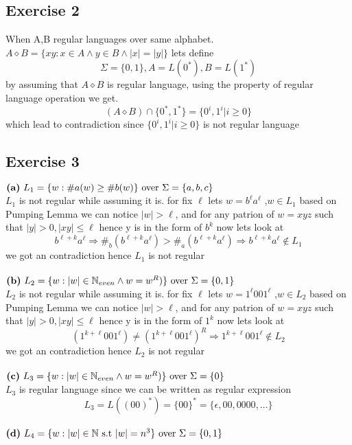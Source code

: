\documentclass[12pt]{article}
\newcommand{\N}{\mathbb{N}}
\begin{document}
\subsection{Exercise 2}
When A,B regular languages over same alphabet. $A \diamond B = \lbrace xy : x \in A \wedge y \in B \wedge |x| = |y|\rbrace$ lets define 
\[
\Sigma=\lbrace 0,1 \rbrace, A=L(0^*), B=L(1^*)
\]
by assuming that $ A \diamond B $ is regular language, using the property of regular language operation we get.
 \[(A \diamond B )\cap \lbrace 0^*,1^*\rbrace=\lbrace 0^i,1^i|i\geq 0 \rbrace
 \]
which lead to contradiction since $\lbrace 0^i,1^i|i\geq 0 \rbrace $ is not regular language
\subsection{Exercise 3}
$\text{\textbf{(a)} } L_1 = \lbrace w : \# a(w) \geq \# b(w)\rbrace  \text{ over } \Sigma =  \lbrace a, b, c\rbrace$\\
  $L_1$ is not regular while assuming it is. for fix $\ell$ lets $w=b^\ell a^\ell$ ,$w\in L_1$ based on Pumping Lemma we can notice $|w|>\ell$, and for any patrion of $w=xyz$ such that $|y|>0,|xy|\leq \ell$ hence y is in the form  of $b^k$ now lets look at 
  \[
  b^{\ell+k}a^{\ell}\Rightarrow \#_{b}(b^{\ell+k}a^{\ell})>\#_{a}(b^{\ell+k}a^{\ell})\Rightarrow b^{\ell+k}a^{\ell} \notin L_1
  \]
we got an contradiction hence $L_1$ is not regular\\\\
$\text{\textbf{(b)} } L_2 = \lbrace w : |w| \in \N_{even} \wedge w=w^R )\rbrace  \text{ over } \Sigma =  \lbrace 0,1 \rbrace$\\
$L_2$ is not regular while assuming it is. for fix $\ell$ lets $w=1^\ell001^\ell$ ,$w\in L_2$ based on Pumping Lemma we can notice $|w|>\ell$, and for any patrion of $w=xyz$ such that $|y|>0,|xy|\leq \ell$ hence y is in the form  of $1^k$ now lets look at
  \[
  (1^{k+\ell}001^\ell)\neq (1^{k+\ell}001^\ell)^R\Rightarrow 1^{k+\ell}001^\ell \notin L_2
  \]
we got an contradiction hence $L_2$ is not regular\\\\
$\text{\textbf{(c)} } L_3 = \lbrace w : |w| \in \N_{even} \wedge w=w^R )\rbrace  \text{ over } \Sigma =  \lbrace 0 \rbrace$\\ 
$L_3$ is regular language since we can be written  as regular expression
\[
L_3=L((00)^*)=\lbrace 00\rbrace^*=\lbrace\epsilon ,00,0000,\dots\rbrace
\]\\
$\text{\textbf{(d)} } L_4 = \lbrace w : |w| \in \N \text{ s.t } |w|=n^3 \rbrace  \text{ over } \Sigma =  \lbrace 0,1 \rbrace$\\ 
\end{document}
